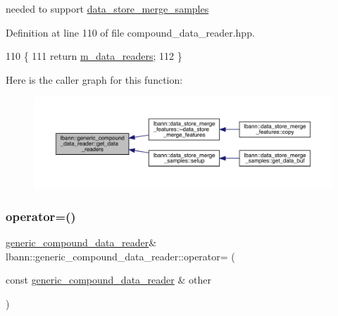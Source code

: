 needed to support \hyperlink{classlbann_1_1data__store__merge__samples}{data\+\_\+store\+\_\+merge\+\_\+samples} 



Definition at line 110 of file compound\+\_\+data\+\_\+reader.\+hpp.


\begin{DoxyCode}
110                                                        \{
111     \textcolor{keywordflow}{return} \hyperlink{classlbann_1_1generic__compound__data__reader_a9815e94ade5873415fd766e09d956d5b}{m\_data\_readers};
112   \}
\end{DoxyCode}
Here is the caller graph for this function\+:\nopagebreak
\begin{figure}[H]
\begin{center}
\leavevmode
\includegraphics[width=350pt]{classlbann_1_1generic__compound__data__reader_a3ba33e29527963baf182b2c034b8ba2d_icgraph}
\end{center}
\end{figure}
\mbox{\label{classlbann_1_1generic__compound__data__reader_a7ece97b6fd2bc62da4d98f29cfb50155}} 
\subsubsection{\texorpdfstring{operator=()}{operator=()}}
{\footnotesize\ttfamily \hyperlink{classlbann_1_1generic__compound__data__reader}{generic\+\_\+compound\+\_\+data\+\_\+reader}\& lbann\+::generic\+\_\+compound\+\_\+data\+\_\+reader\+::operator= (\begin{DoxyParamCaption}\item[{const \hyperlink{classlbann_1_1generic__compound__data__reader}{generic\+\_\+compound\+\_\+data\+\_\+reader} \&}]{other }\end{DoxyParamCaption})\hspace{0.3cm}{\ttfamily [inline]}}



